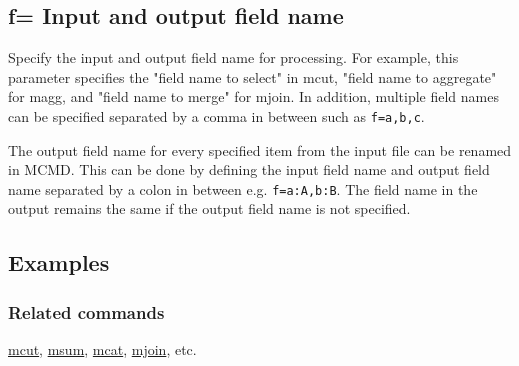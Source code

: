 %

\subsection{f= Input and output field name\label{sect:option_f}}

Specify the input and output field name for processing.
For example, this parameter specifies the "field name to select" in mcut, "field name to aggregate" for magg, and "field name to merge" for mjoin.
In addition, multiple field names can be specified separated by a comma in between such as \verb|f=a,b,c|.

The output field name for every specified item from the input file can be renamed in MCMD. This can be done by defining the input field name and output field name separated by a colon in between e.g. \verb|f=a:A,b:B|. The field name in the output remains the same if the output field name is not specified. 

\subsection*{Examples}


\subsubsection*{Related commands}
\hyperref[sect:mcut]{mcut},
\hyperref[sect:msum]{msum},
\hyperref[sect:mcat]{mcat},
\hyperref[sect:mjoin]{mjoin}, etc. 

%

